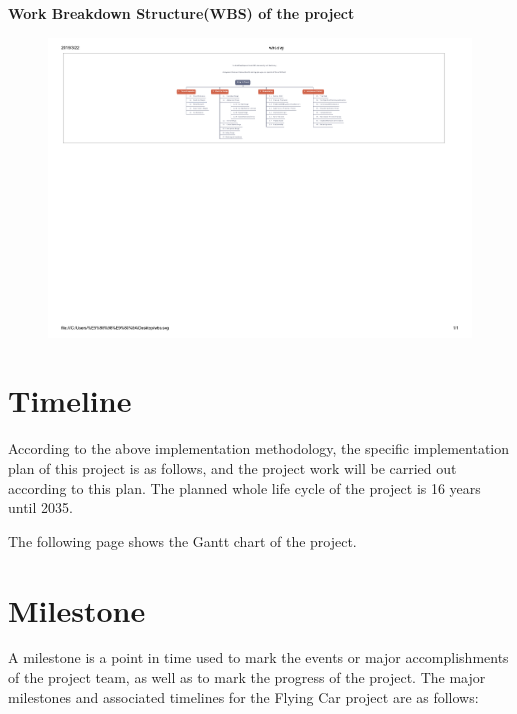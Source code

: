 \begin{landscape}

\begin{center}
\Large \textbf{Work Breakdown Structure(WBS) of the project}     

\begin{figure}[!htb]
\centering
\includegraphics[angle=-90,width=25cm]{pic/wbs.pdf}
\end{figure}

\end{center}

\end{landscape}

\section{Timeline}

According to the above implementation methodology, the specific implementation plan of this project is as follows, and the project work will be carried out according to this plan. The planned whole life cycle of the project is 16 years until 2035. 

The following page shows the Gantt chart of the project.

\section{Milestone}

A milestone is a point in time used to mark the events or major accomplishments of the project team, as well as to mark the progress of the project. The major milestones and associated timelines for the Flying Car project are as follows:

